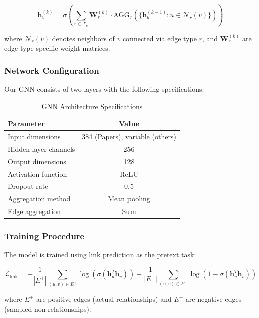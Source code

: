 \documentclass[conference]{IEEEtran}
\begin{document}
\begin{equation}
\mathbf{h}_v^{(k)} = \sigma\left(\sum_{r \in \mathcal{T}_e} \mathbf{W}_r^{(k)} \cdot \text{AGG}_r\left(\{\mathbf{h}_u^{(k-1)} : u \in \mathcal{N}_r(v)\}\right)\right)
\end{equation}

where $\mathcal{N}_r(v)$ denotes neighbors of $v$ connected via edge type $r$, and $\mathbf{W}_r^{(k)}$ are edge-type-specific weight matrices.

\subsubsection{Network Configuration}
Our GNN consists of two layers with the following specifications:

\begin{table}[htbp]
\caption{GNN Architecture Specifications}
\begin{center}
\begin{tabular}{|l|c|}
\hline
\textbf{Parameter} & \textbf{Value} \\
\hline
Input dimensions & 384 (Papers), variable (others) \\
Hidden layer channels & 256 \\
Output dimensions & 128 \\
Activation function & ReLU \\
Dropout rate & 0.5 \\
Aggregation method & Mean pooling \\
Edge aggregation & Sum \\
\hline
\end{tabular}
\label{tab:gnn_config}
\end{center}
\end{table}

\subsubsection{Training Procedure}
The model is trained using link prediction as the pretext task:

\begin{equation}
\mathcal{L}_{\text{link}} = -\frac{1}{|E^+|}\sum_{(u,v) \in E^+} \log(\sigma(\mathbf{h}_u^T \mathbf{h}_v)) - \frac{1}{|E^-|}\sum_{(u,v) \in E^-} \log(1-\sigma(\mathbf{h}_u^T \mathbf{h}_v))
\end{equation}

where $E^+$ are positive edges (actual relationships) and $E^-$ are negative edges (sampled non-relationships).
\end{document}
